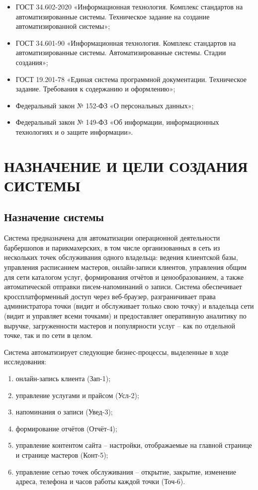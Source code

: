 \begin{itemize}
  \item ГОСТ 34.602-2020 «Информационная технология. Комплекс стандартов на автоматизированные системы. Техническое задание на создание автоматизированной системы»;
  \item ГОСТ 34.601-90 «Информационная технология. Комплекс стандартов на автоматизированные системы. Автоматизированные системы. Стадии создания»;
  \item ГОСТ 19.201-78 «Единая система программной документации. Техническое задание. Требования к содержанию и оформлению»;
  \item Федеральный закон № 152-ФЗ «О персональных данных»;
  \item Федеральный закон № 149-ФЗ «Об информации, информационных технологиях и о защите информации».
\end{itemize}



\section{НАЗНАЧЕНИЕ И ЦЕЛИ СОЗДАНИЯ СИСТЕМЫ}

\subsection{Назначение системы}

Система предназначена для автоматизации операционной деятельности барбершопов и парикмахерских, в том числе организованных в сеть из нескольких точек обслуживания одного владельца: ведения клиентской базы, управления расписанием мастеров, онлайн-записи клиентов, управления общим для сети каталогом услуг, формирования отчётов и ценообразованием, а также автоматической отправки писем-напоминаний о записи. Система обеспечивает кроссплатформенный доступ через веб-браузер, разграничивает права администратора точки (видит и обслуживает только свою точку) и владельца сети (видит и управляет всеми точками) и предоставляет оперативную аналитику по выручке, загруженности мастеров и популярности услуг -- как по отдельной точке, так и по сети в целом.

Система автоматизирует следующие бизнес-процессы, выделенные в ходе исследования:
\begin{enumerate}
  \item онлайн-запись клиента (Зап-1);
  \item управление услугами и прайсом (Усл-2);
  \item напоминания о записи (Увед-3);
  \item формирование отчётов (Отчёт-4);
  \item управление контентом сайта -- настройки, отображаемые на главной странице и странице мастеров (Конт-5);
  \item управление сетью точек обслуживания -- открытие, закрытие, изменение адреса, телефона и часов работы каждой точки (Точ-6).
\end{enumerate}

